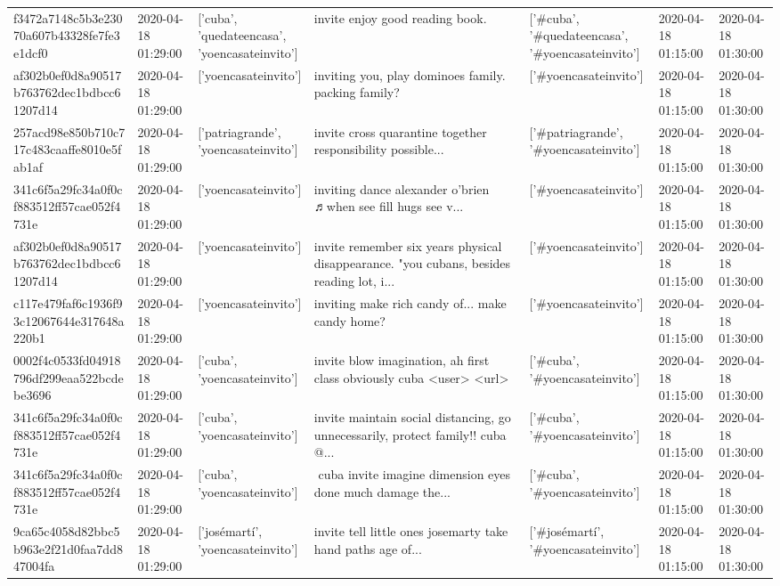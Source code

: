 \begin{tabular}{lllllll}
f3472a7148c5b3e23070a607b43328fe7fe3e1dcf0 & 2020-04-18 01:29:00 & ['cuba', 'quedateencasa', 'yoencasateinvito'] & invite enjoy good reading book. & ['#cuba', '#quedateencasa', '#yoencasateinvito'] & 2020-04-18 01:15:00 & 2020-04-18 01:30:00 \\
af302b0ef0d8a90517b763762dec1bdbcc61207d14 & 2020-04-18 01:29:00 & ['yoencasateinvito'] & inviting you, play dominoes family. packing family? & ['#yoencasateinvito'] & 2020-04-18 01:15:00 & 2020-04-18 01:30:00 \\
257acd98e850b710c717c483caaffe8010e5fab1af & 2020-04-18 01:29:00 & ['patriagrande', 'yoencasateinvito'] & invite cross quarantine together responsibility possible... & ['#patriagrande', '#yoencasateinvito'] & 2020-04-18 01:15:00 & 2020-04-18 01:30:00 \\
341c6f5a29fc34a0f0cf883512ff57cae052f4731e & 2020-04-18 01:29:00 & ['yoencasateinvito'] & inviting dance alexander o'brien ♬when see fill hugs see v... & ['#yoencasateinvito'] & 2020-04-18 01:15:00 & 2020-04-18 01:30:00 \\
af302b0ef0d8a90517b763762dec1bdbcc61207d14 & 2020-04-18 01:29:00 & ['yoencasateinvito'] & invite remember six years physical disappearance. "you cubans, besides reading lot, i... & ['#yoencasateinvito'] & 2020-04-18 01:15:00 & 2020-04-18 01:30:00 \\
c117e479faf6c1936f93c12067644e317648a220b1 & 2020-04-18 01:29:00 & ['yoencasateinvito'] & inviting make rich candy of... make candy home? & ['#yoencasateinvito'] & 2020-04-18 01:15:00 & 2020-04-18 01:30:00 \\
0002f4c0533fd04918796df299eaa522bcdebe3696 & 2020-04-18 01:29:00 & ['cuba', 'yoencasateinvito'] & invite blow imagination, ah first class obviously cuba <user> <url> & ['#cuba', '#yoencasateinvito'] & 2020-04-18 01:15:00 & 2020-04-18 01:30:00 \\
341c6f5a29fc34a0f0cf883512ff57cae052f4731e & 2020-04-18 01:29:00 & ['cuba', 'yoencasateinvito'] & invite maintain social distancing, go unnecessarily, protect family!!️ cuba @... & ['#cuba', '#yoencasateinvito'] & 2020-04-18 01:15:00 & 2020-04-18 01:30:00 \\
341c6f5a29fc34a0f0cf883512ff57cae052f4731e & 2020-04-18 01:29:00 & ['cuba', 'yoencasateinvito'] & ️ cuba invite imagine dimension eyes done much damage the... & ['#cuba', '#yoencasateinvito'] & 2020-04-18 01:15:00 & 2020-04-18 01:30:00 \\
9ca65c4058d82bbc5b963e2f21d0faa7dd847004fa & 2020-04-18 01:29:00 & ['josémartí', 'yoencasateinvito'] & invite tell little ones josemarty take hand paths age of... & ['#josémartí', '#yoencasateinvito'] & 2020-04-18 01:15:00 & 2020-04-18 01:30:00 \\

\end{tabular}
